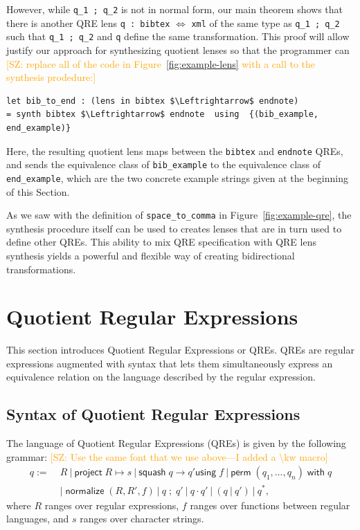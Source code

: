 \documentclass{svproc}
\newcommand{\cd}[1]{\lstinline[backgroundcolor=\color{white}]$#1$}
\newcommand{\FINISH}[3]{\ifdraft\textcolor{#1}{[#2: #3]}\fi}
\newcommand{\saz}[1]{\FINISH{orange}{SZ}{#1}}
\newcommand{\kw}[1]{\ensuremath{\mathsf{#1}}}
\newcommand{\project}[2]{\ensuremath{\kw{project} \; #1 \mapsto #2}}
\newcommand{\squash}[3]{\ensuremath{\kw{squash} \; #1 \rightarrow #2
\kw{using} \; #3}}
\newcommand{\perm}[2]{\ensuremath{\kw{perm}\; (#1)\; \kw{with}\; #2}}
\newcommand{\normalize}[3]{\ensuremath{\kw{normalize} \; (#1, #2, #3)}}
\newcommand{\sep}{\ensuremath{\ | \ }}
\newcommand{\semicolon}{\ensuremath{\; ; \;}}
\begin{document}
\noindent However, while \cd{q_1 ; q_2} is not in normal form, our main theorem
shows that there is another QRE lens \cd{q : bibtex} $\Leftrightarrow$ \cd{xml} of the same type as
\cd{q_1 ; q_2} such that \cd{q_1 ; q_2} and \cd{q} define the same
transformation. This proof will allow justify our approach for synthesizing
quotient lenses so that the programmer can \saz{replace all of the code in
  Figure~\ref{fig:example-lens} with a call to the synthesis prodedure:}

\begin{lstlisting}
let bib_to_end : (lens in bibtex $\Leftrightarrow$ endnote) 
= synth bibtex $\Leftrightarrow$ endnote  using  {(bib_example, end_example)}
\end{lstlisting}
\noindent Here, the resulting  quotient lens maps between the \cd{bibtex} and
\cd{endnote} QREs, and sends the equivalence class of \cd{bib_example} to
the equivalence class of \cd{end_example}, which are the two concrete example
strings given at the beginning of this Section.

As we saw with the definition of \cd{space_to_comma} in
Figure~\ref{fig:example-qre}, the synthesis procedure itself can be used to
creates lenses that are in turn used to define other QREs.  This ability to mix
QRE specification with QRE lens synthesis yields a powerful and flexible way of
creating bidirectional transformations.

\section{Quotient Regular Expressions}
\label{QRE}

This section introduces Quotient Regular Expressions or QREs. QREs are regular
expressions augmented with syntax that lets them simultaneously express an
equivalence relation on the language described by the regular expression.

\subsection{Syntax of Quotient Regular Expressions}
The language of Quotient Regular Expressions (QREs) is given by the following
grammar:  \saz{Use the same font that we use above---I added a \textbackslash kw
macro}
\begin{align*}
q := \; &R \sep \project{R}{s} \sep \squash{q}{q'}{f} \sep
\perm{q_1, \ldots, q_n}{q} \\
  & | \; \normalize{R}{R'}{f} \sep q \semicolon q' \sep q \cdot q' \sep (q \sep q') \sep q^*,
\end{align*}
where $R$ ranges over regular expressions, $f$ ranges over functions between
regular languages, and $s$ ranges over character strings.
\end{document}
